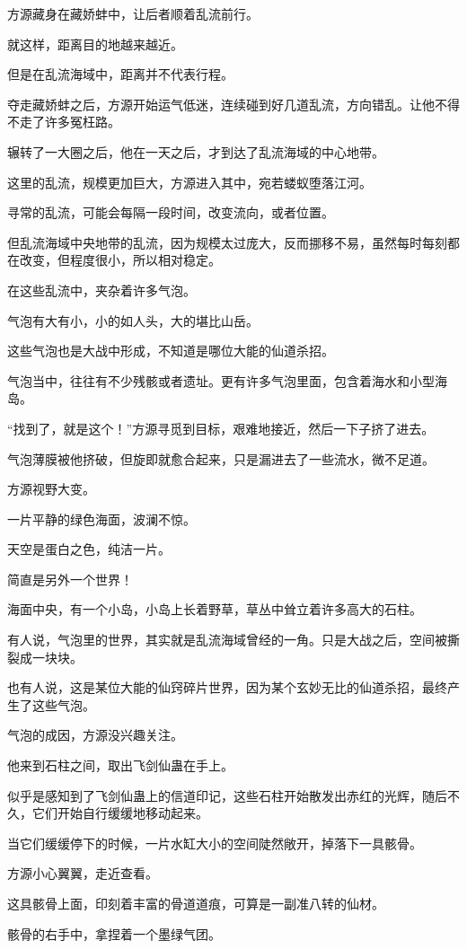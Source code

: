 \begin{this_body}
方源藏身在藏娇蚌中，让后者顺着乱流前行。

就这样，距离目的地越来越近。

但是在乱流海域中，距离并不代表行程。

夺走藏娇蚌之后，方源开始运气低迷，连续碰到好几道乱流，方向错乱。让他不得不走了许多冤枉路。

辗转了一大圈之后，他在一天之后，才到达了乱流海域的中心地带。

这里的乱流，规模更加巨大，方源进入其中，宛若蝼蚁堕落江河。

寻常的乱流，可能会每隔一段时间，改变流向，或者位置。

但乱流海域中央地带的乱流，因为规模太过庞大，反而挪移不易，虽然每时每刻都在改变，但程度很小，所以相对稳定。

在这些乱流中，夹杂着许多气泡。

气泡有大有小，小的如人头，大的堪比山岳。

这些气泡也是大战中形成，不知道是哪位大能的仙道杀招。

气泡当中，往往有不少残骸或者遗址。更有许多气泡里面，包含着海水和小型海岛。

“找到了，就是这个！”方源寻觅到目标，艰难地接近，然后一下子挤了进去。

气泡薄膜被他挤破，但旋即就愈合起来，只是漏进去了一些流水，微不足道。

方源视野大变。

一片平静的绿色海面，波澜不惊。

天空是蛋白之色，纯洁一片。

简直是另外一个世界！

海面中央，有一个小岛，小岛上长着野草，草丛中耸立着许多高大的石柱。

有人说，气泡里的世界，其实就是乱流海域曾经的一角。只是大战之后，空间被撕裂成一块块。

也有人说，这是某位大能的仙窍碎片世界，因为某个玄妙无比的仙道杀招，最终产生了这些气泡。

气泡的成因，方源没兴趣关注。

他来到石柱之间，取出飞剑仙蛊在手上。

似乎是感知到了飞剑仙蛊上的信道印记，这些石柱开始散发出赤红的光辉，随后不久，它们开始自行缓缓地移动起来。

当它们缓缓停下的时候，一片水缸大小的空间陡然敞开，掉落下一具骸骨。

方源小心翼翼，走近查看。

这具骸骨上面，印刻着丰富的骨道道痕，可算是一副准八转的仙材。

骸骨的右手中，拿捏着一个墨绿气团。


\end{this_body}
